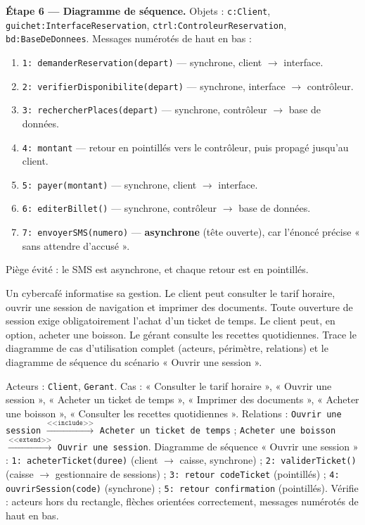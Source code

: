 \documentclass[11pt]{article}
\begin{document}
\begin{exoresolu}
\textbf{Étape 6 — Diagramme de séquence.} Objets : \texttt{c:Client}, \texttt{guichet:InterfaceReservation}, \texttt{ctrl:ControleurReservation}, \texttt{bd:BaseDeDonnees}. Messages numérotés de haut en bas :
\begin{enumerate}
\item \texttt{1: demanderReservation(depart)} — synchrone, client $\rightarrow$ interface.
\item \texttt{2: verifierDisponibilite(depart)} — synchrone, interface $\rightarrow$ contrôleur.
\item \texttt{3: rechercherPlaces(depart)} — synchrone, contrôleur $\rightarrow$ base de données.
\item \texttt{4: montant} — retour en pointillés vers le contrôleur, puis propagé jusqu'au client.
\item \texttt{5: payer(montant)} — synchrone, client $\rightarrow$ interface.
\item \texttt{6: editerBillet()} — synchrone, contrôleur $\rightarrow$ base de données.
\item \texttt{7: envoyerSMS(numero)} — \textbf{asynchrone} (tête ouverte), car l'énoncé précise « sans attendre d'accusé ».
\end{enumerate}
Piège évité : le SMS est asynchrone, et chaque retour est en pointillés.
\end{exoresolu}

\begin{exercice}
Un cybercafé informatise sa gestion. Le client peut consulter le tarif horaire, ouvrir une session de navigation et imprimer des documents. Toute ouverture de session exige obligatoirement l'achat d'un ticket de temps. Le client peut, en option, acheter une boisson. Le gérant consulte les recettes quotidiennes. Trace le diagramme de cas d'utilisation complet (acteurs, périmètre, relations) et le diagramme de séquence du scénario « Ouvrir une session ».
\end{exercice}

\begin{corrige}
Acteurs : \texttt{Client}, \texttt{Gerant}. Cas : « Consulter le tarif horaire », « Ouvrir une session », « Acheter un ticket de temps », « Imprimer des documents », « Acheter une boisson », « Consulter les recettes quotidiennes ». Relations : \texttt{Ouvrir une session} $\xrightarrow{\texttt{<<include>>}}$ \texttt{Acheter un ticket de temps} ; \texttt{Acheter une boisson} $\xrightarrow{\texttt{<<extend>>}}$ \texttt{Ouvrir une session}. Diagramme de séquence « Ouvrir une session » : \texttt{1: acheterTicket(duree)} (client $\rightarrow$ caisse, synchrone) ; \texttt{2: validerTicket()} (caisse $\rightarrow$ gestionnaire de sessions) ; \texttt{3: retour codeTicket} (pointillés) ; \texttt{4: ouvrirSession(code)} (synchrone) ; \texttt{5: retour confirmation} (pointillés). Vérifie : acteurs hors du rectangle, flèches orientées correctement, messages numérotés de haut en bas.
\end{corrige}
\end{document}

